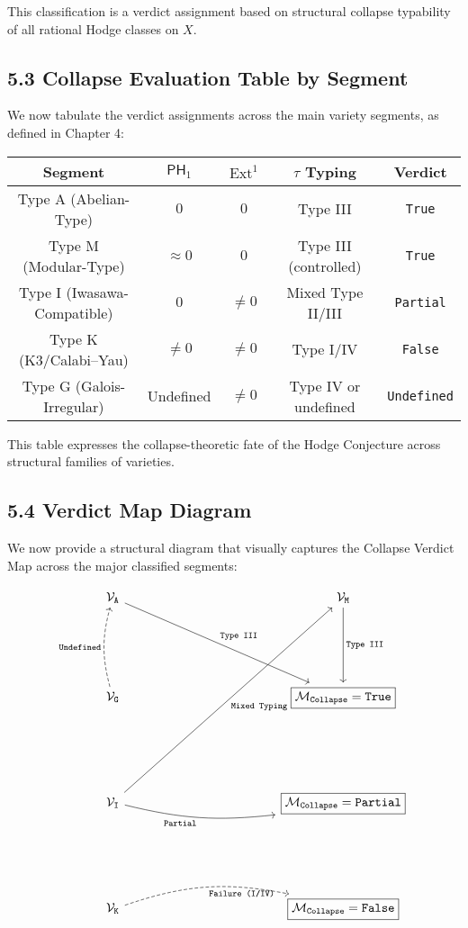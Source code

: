 \documentclass[11pt]{article}
\DeclareMathOperator{\Ext}{Ext}
\begin{document}
This classification is a verdict assignment based on structural collapse typability of all rational Hodge classes on $X$.

\subsection{5.3 Collapse Evaluation Table by Segment}

We now tabulate the verdict assignments across the main variety segments, as defined in Chapter 4:

\begin{center}
\renewcommand{\arraystretch}{1.3}
\begin{tabular}{|c|c|c|c|c|}
\hline
\textbf{Segment} & $\mathsf{PH}_1$ & $\Ext^1$ & $\tau$ Typing & \textbf{Verdict} \\
\hline
Type A (Abelian-Type) & $0$ & $0$ & Type III & \texttt{True} \\
\hline
Type M (Modular-Type) & $\approx 0$ & $0$ & Type III (controlled) & \texttt{True} \\
\hline
Type I (Iwasawa-Compatible) & $0$ & $\ne 0$ & Mixed Type II/III & \texttt{Partial} \\
\hline
Type K (K3/Calabi–Yau) & $\ne 0$ & $\ne 0$ & Type I/IV & \texttt{False} \\
\hline
Type G (Galois-Irregular) & Undefined & $\ne 0$ & Type IV or undefined & \texttt{Undefined} \\
\hline
\end{tabular}
\end{center}

This table expresses the collapse-theoretic fate of the Hodge Conjecture across structural families of varieties.

\subsection{5.4 Verdict Map Diagram}

We now provide a structural diagram that visually captures the Collapse Verdict Map across the major classified segments:

\[
\begin{tikzcd}[row sep=6em, column sep=12em] %
|[alias=A]| \mathcal{V}_{\texttt{A}} \ar[dr, "\texttt{Type III}"] 
  & |[alias=M]| \mathcal{V}_{\texttt{M}} \ar[d, "\texttt{Type III}"] \\
|[alias=G]| \mathcal{V}_{\texttt{G}} 
  \ar[dashed, to=A, bend left=15, "\texttt{Undefined}"] 
  & |[alias=T]| \boxed{\mathcal{M}_{\texttt{Collapse}} = \texttt{True}} \\
|[alias=I]| \mathcal{V}_{\texttt{I}} 
  \ar[to=M, "\texttt{Mixed Typing}"'] 
  \ar[to=TP, bend right=10, "\texttt{Partial}"'] 
  & |[alias=TP]| \boxed{\mathcal{M}_{\texttt{Collapse}} = \texttt{Partial}} \\
|[alias=K]| \mathcal{V}_{\texttt{K}} 
  \ar[to=TF, dashed, bend left=15, "\texttt{Failure (I/IV)}"'] 
  & |[alias=TF]| \boxed{\mathcal{M}_{\texttt{Collapse}} = \texttt{False}}
\end{tikzcd}
\]
\end{document}
